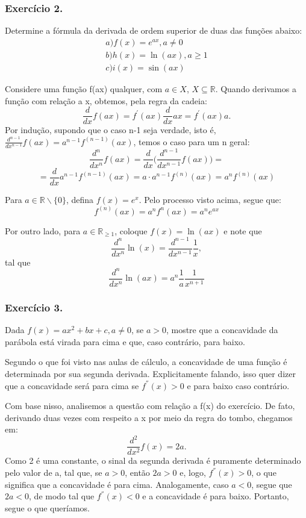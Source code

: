 \subsubsection{Exerc\'icio 2.}Determine a f\'ormula da derivada de ordem superior de duas das fun\c c\~oes abaixo:
\begin{align*}
	a)f(x) = e^{ax}, a\neq{0} \\
	b)h(x) = \ln(ax), a\geq1 \\
	c)i(x) = \sin(ax)
\end{align*}

\begin{proof*}
Considere uma fun\c c\~ao f(ax) qualquer, com $a\in{X}$, $X\subseteq{\mathbb{R}}$. Quando derivamos
a fun\c c\~ao com rela\c c\~ao a x, obtemos, pela regra da cadeia:
$$
\frac{d}{dx}f(ax) = f^{'}(ax)\frac{d}{dx}ax = f^{'}(ax)a.
$$
Por indu\c c\~ao, supondo que o caso n-1 seja verdade, isto \'e, $\frac{d^{n-1}}{d x^{n-1}}f(ax) = a^{n-1}f^{(n-1)}(ax)$,
temos o caso para um n geral:
$$
\frac{d^n}{d x^n}f(ax) = \frac{d}{dx}\biggl(\frac{d^{n-1}}{d x^{n-1}}f(ax)\biggr) =
$$
$$
= \frac{d}{dx}a^{n-1}f^{(n-1)}(ax) = a\cdot{a^{n-1}}f^{(n)}(ax) = a^{n}f^{(n)}(ax)
$$

Para $a\in{\mathbb{R}\backslash\{0\}}$, defina $f(x) = e^x$. Pelo processo visto acima, segue que:
$$
f^{(n)}(ax) = a^nf^{n}(ax) = a^ne^{ax}
$$

Por outro lado, para $a\in{\mathbb{R}_{\geq1}}$, coloque $f(x) = \ln(ax)$ e note que 
$$
\frac{d^n}{dx^n}\ln(x) = \frac{d^{n-1}}{dx^{n-1}}\frac{1}{x},
$$
tal que 
$$
\frac{d^n}{dx^n}\ln(ax) = a^{n}\frac{1}{a}\frac{1}{x^{n+1}}
$$
\end{proof*}

\subsubsection{Exerc\'icio 3.} Dada $f(x) = ax^2 + bx + c, a\neq{0}$, se $a > 0$, mostre que 
a concavidade da par\'abola est\'a virada para cima e que, caso contr\'ario, para baixo.

\begin{proof*}
Segundo o que foi visto nas aulas de c\'alculo, a concavidade de uma fun\c c\~ao \'e determinada
por sua segunda derivada. Explicitamente falando, isso quer dizer que a concavidade ser\'a para
cima se $f^{''}(x) > 0$ e para baixo caso contr\'ario.

Com base nisso, analisemos a quest\~ao com rela\c c\~ao a f(x) do exerc\'icio. De fato, derivando 
duas vezes com respeito a x por meio da regra do tombo, chegamos em:
$$
\frac{d^2}{dx^2}f(x) = 2a.
$$
Como 2 \'e uma constante, o sinal da segunda derivada \'e puramente determinado pelo valor de a,
tal que, se $a > 0$, ent\~ao $2a > 0$ e, logo, $f^{''}(x) > 0$, o que significa que a concavidade
\'e para cima. Analogamente, caso $a < 0$, segue que $2a < 0$, de modo tal que $f^{''}(x) < 0$ e
a concavidade \'e para baixo. Portanto, segue o que quer\'iamos.
\qedsymbol 
\end{proof*}

